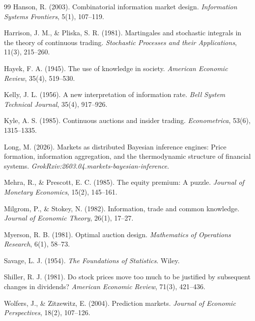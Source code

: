 \documentclass[12pt,a4paper]{article}
\theoremstyle{definition}
\begin{document}
\begin{thebibliography}{99}
Hanson, R. (2003). Combinatorial information market design. \textit{Information Systems Frontiers}, 5(1), 107--119.

Harrison, J. M., \& Pliska, S. R. (1981). Martingales and stochastic integrals in the theory of continuous trading. \textit{Stochastic Processes and their Applications}, 11(3), 215--260.

Hayek, F. A. (1945). The use of knowledge in society. \textit{American Economic Review}, 35(4), 519--530.

Kelly, J. L. (1956). A new interpretation of information rate. \textit{Bell System Technical Journal}, 35(4), 917--926.

Kyle, A. S. (1985). Continuous auctions and insider trading. \textit{Econometrica}, 53(6), 1315--1335.

Long, M. (2026). Markets as distributed Bayesian inference engines: Price formation, information aggregation, and the thermodynamic structure of financial systems. \textit{GrokRxiv:2603.04.markets-bayesian-inference}.

Mehra, R., \& Prescott, E. C. (1985). The equity premium: A puzzle. \textit{Journal of Monetary Economics}, 15(2), 145--161.

Milgrom, P., \& Stokey, N. (1982). Information, trade and common knowledge. \textit{Journal of Economic Theory}, 26(1), 17--27.

Myerson, R. B. (1981). Optimal auction design. \textit{Mathematics of Operations Research}, 6(1), 58--73.

Savage, L. J. (1954). \textit{The Foundations of Statistics}. Wiley.

Shiller, R. J. (1981). Do stock prices move too much to be justified by subsequent changes in dividends? \textit{American Economic Review}, 71(3), 421--436.

Wolfers, J., \& Zitzewitz, E. (2004). Prediction markets. \textit{Journal of Economic Perspectives}, 18(2), 107--126.

\end{thebibliography}
\end{document}
